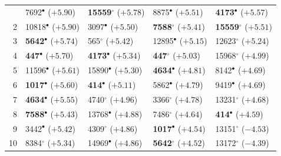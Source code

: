 \begin{table}[t]
\begin{tabular}{@{}rllll@{}}
\addlinespace
1 & 7692$^{\bullet}$ ($+5.90$) & \textbf{15559}$^{\circ}$ ($+5.78$) & 8875$^{\bullet}$ ($+5.51$) & \textbf{4173}$^{\bullet}$ ($+5.57$) \\
2 & 10818$^{\bullet}$ ($+5.90$) & 3097$^{\bullet}$ ($+5.50$) & \textbf{7588}$^{\circ}$ ($+5.41$) & \textbf{15559}$^{\circ}$ ($+5.51$) \\
3 & \textbf{5642}$^{\bullet}$ ($+5.74$) & 565$^{\circ}$ ($+5.42$) & 12895$^{\bullet}$ ($+5.15$) & 12623$^{\circ}$ ($+5.24$) \\
4 & \textbf{447}$^{\bullet}$ ($+5.70$) & \textbf{4173}$^{\bullet}$ ($+5.34$) & \textbf{447}$^{\circ}$ ($+5.03$) & 15968$^{\circ}$ ($+4.99$) \\
5 & 11596$^{\bullet}$ ($+5.61$) & 15890$^{\bullet}$ ($+5.30$) & \textbf{4634}$^{\bullet}$ ($+4.81$) & 8142$^{\bullet}$ ($+4.69$) \\
6 & \textbf{1017}$^{\bullet}$ ($+5.60$) & \textbf{414}$^{\bullet}$ ($+5.11$) & 5862$^{\bullet}$ ($+4.79$) & 9419$^{\bullet}$ ($+4.69$) \\
7 & \textbf{4634}$^{\bullet}$ ($+5.55$) & 4740$^{\circ}$ ($+4.96$) & 3366$^{\circ}$ ($+4.78$) & 13231$^{\circ}$ ($+4.68$) \\
8 & \textbf{7588}$^{\bullet}$ ($+5.43$) & 13768$^{\bullet}$ ($+4.88$) & 7486$^{\circ}$ ($+4.64$) & \textbf{414}$^{\bullet}$ ($+4.59$) \\
9 & 3442$^{\bullet}$ ($+5.42$) & 4309$^{\circ}$ ($+4.86$) & \textbf{1017}$^{\bullet}$ ($+4.54$) & 13151$^{\circ}$ ($-4.53$) \\
10 & 8384$^{\circ}$ ($+5.34$) & 14969$^{\bullet}$ ($+4.86$) & \textbf{5642}$^{\circ}$ ($+4.52$) & 13172$^{\circ}$ ($-4.39$) \\
\bottomrule
\end{tabular}
\end{table}

